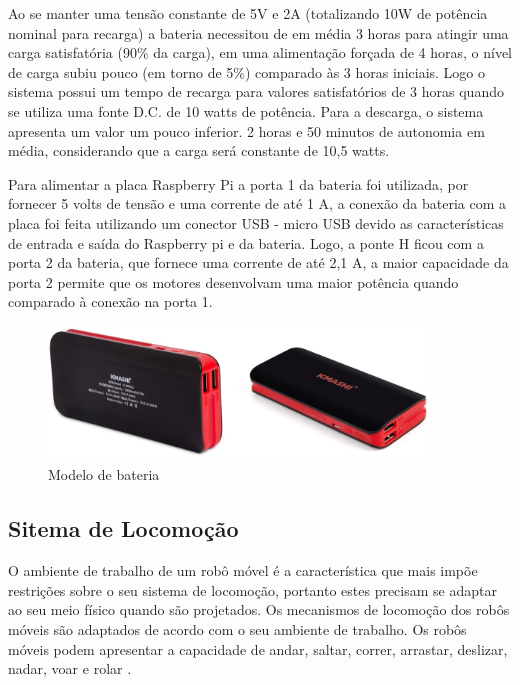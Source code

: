 Ao se manter uma tensão constante de 5V e 2A (totalizando 10W de potência nominal para recarga) a bateria necessitou de em média 3 horas
para atingir uma carga satisfatória (90\% da carga), em uma alimentação forçada de 4 horas, o nível de carga subiu pouco (em torno de 5\%)
comparado às 3 horas iniciais. Logo o sistema possui um tempo de recarga para valores satisfatórios de 3 horas quando se utiliza uma fonte
D.C. de 10 watts de potência. Para a descarga, o sistema apresenta um valor um pouco inferior. 2 horas e 50 minutos de autonomia em média,
considerando que a carga será constante de 10,5 watts.

Para alimentar a placa Raspberry Pi a porta 1 da bateria foi utilizada, por fornecer 5 volts de tensão e uma corrente de até 1 A, a
conexão da bateria com a placa foi feita utilizando um conector USB - micro USB devido as características de entrada e saída do Raspberry
pi e da bateria. Logo, a ponte H ficou com a porta 2 da bateria, que fornece uma corrente de até 2,1 A, a maior capacidade da porta 2
permite que os motores desenvolvam uma maior potência quando comparado à conexão na porta 1.

\begin{figure}[H]
    \centering
    \includegraphics[width=0.9\textwidth]{figuras/baterias.eps}
    \caption{Modelo de bateria}
    \label{fig:bateria}
\end{figure}

\subsection{Sitema de Locomoção}

O ambiente de trabalho de um robô móvel é a característica que mais impõe restrições sobre o seu sistema de locomoção, portanto estes
precisam se adaptar ao seu meio físico quando são projetados. Os mecanismos de locomoção dos robôs móveis são adaptados de acordo com
o seu ambiente de trabalho. Os robôs móveis podem apresentar a capacidade de andar, saltar, correr, arrastar, deslizar, nadar, voar
e rolar \cite{secchi:2008}.

